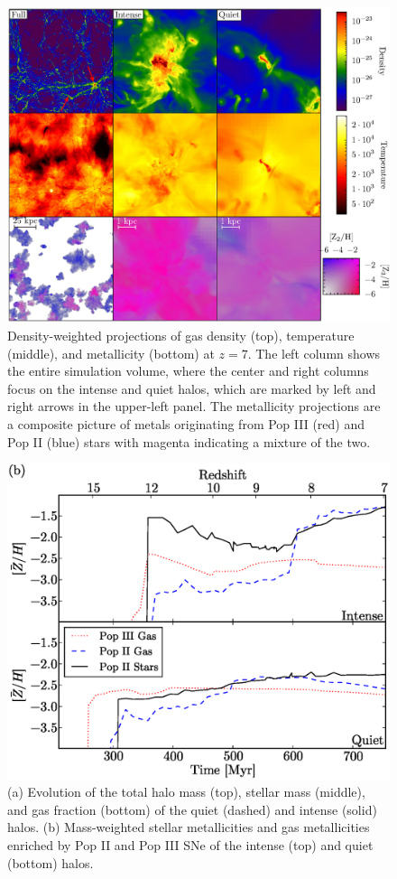 \documentclass[12pt]{article}
\begin{document}
\clearpage
\begin{figure}
\includegraphics[width=\textwidth]{f1.eps}
\caption{\label{fig:projections} Density-weighted projections of gas
  density (top), temperature (middle), and metallicity (bottom) at
  $z=7$.  The left column shows the entire simulation volume, where
  the center and right columns focus on the intense and quiet halos,
  which are marked by left and right arrows in the upper-left panel.
  The metallicity projections are a composite picture of metals
  originating from Pop III (red) and Pop II (blue) stars with magenta
  indicating a mixture of the two.}
\end{figure}

\clearpage
\begin{figure}
\includegraphics[width=\textwidth]{f2.eps}
\caption{\label{fig:evo} (a) Evolution of the total halo mass (top),
  stellar mass (middle), and gas fraction (bottom) of the quiet
  (dashed) and intense (solid) halos.  (b) Mass-weighted stellar
  metallicities and gas metallicities enriched by Pop II and Pop III
  SNe of the intense (top) and quiet (bottom) halos.}
\end{figure}
\end{document}
